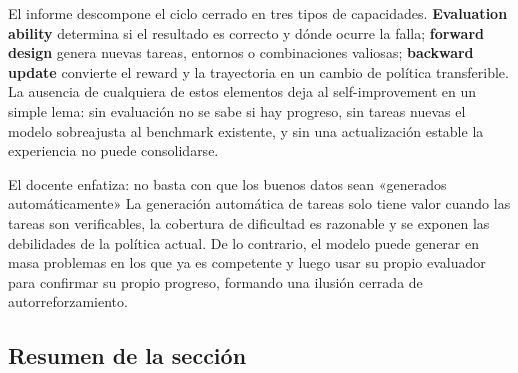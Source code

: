 
El informe descompone el ciclo cerrado en tres tipos de capacidades. \textbf{Evaluation ability} determina si el resultado es correcto y dónde ocurre la falla; \textbf{forward design} genera nuevas tareas, entornos o combinaciones valiosas; \textbf{backward update} convierte el reward y la trayectoria en un cambio de política transferible. La ausencia de cualquiera de estos elementos deja al self-improvement en un simple lema: sin evaluación no se sabe si hay progreso, sin tareas nuevas el modelo sobreajusta al benchmark existente, y sin una actualización estable la experiencia no puede consolidarse.





\begin{knowledgebox}{El docente enfatiza: no basta con que los buenos datos sean «generados automáticamente»}
La generación automática de tareas solo tiene valor cuando las tareas son verificables, la cobertura de dificultad es razonable y se exponen las debilidades de la política actual. De lo contrario, el modelo puede generar en masa problemas en los que ya es competente y luego usar su propio evaluador para confirmar su propio progreso, formando una ilusión cerrada de autorreforzamiento.
\end{knowledgebox}

\subsection{Resumen de la sección}

